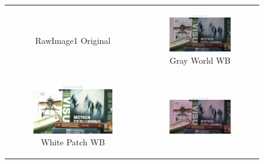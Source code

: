 \documentclass[11pt, a4]{article}
\begin{document}
\begin{enumerate}
\begin{figure}[h]
{\begin{tabular}{cc}
\begin{subfigure}[h]{0.45\linewidth}
							\caption{RawImage1 Original}
							\label{fig:RawImage1_WB_1}
						\end{subfigure} &
						\begin{subfigure}[h]{0.45\linewidth}
							\centering
							\includegraphics[width=\linewidth]{../output/RawImage1_WB_2.pdf}
							\caption{Gray World WB}
							\label{fig:RawImage1_WB_2}
						\end{subfigure}\\
						\begin{subfigure}[h]{0.45\linewidth}
							\centering
							\includegraphics[width=\linewidth]{../output/RawImage1_WB_3.pdf}
							\caption{White Patch WB}
							\label{fig:RawImage1_WB_3}
						\end{subfigure} &
						\begin{subfigure}[h]{0.45\linewidth}
							\centering
							\includegraphics[width=\linewidth]{../output/RawImage1_WB_4.pdf}

\end{subfigure}
\end{tabular}}
\end{figure}
\end{enumerate}
\end{document}
